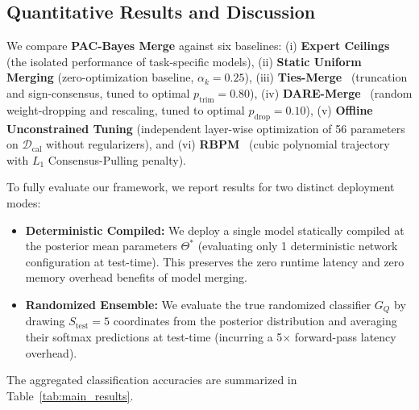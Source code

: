\subsection{Quantitative Results and Discussion}
\label{subsec:quantitative_results}
We compare \textbf{PAC-Bayes Merge} against six baselines: (i) \textbf{Expert Ceilings} (the isolated performance of task-specific models), (ii) \textbf{Static Uniform Merging} (zero-optimization baseline, $\alpha_k = 0.25$), (iii) \textbf{Ties-Merge}~\cite{yadav2023ties} (truncation and sign-consensus, tuned to optimal $p_{\text{trim}}=0.80$), (iv) \textbf{DARE-Merge}~\cite{yu2023dare} (random weight-dropping and rescaling, tuned to optimal $p_{\text{drop}}=0.10$), (v) \textbf{Offline Unconstrained Tuning} (independent layer-wise optimization of 56 parameters on $\mathcal{D}_{\text{cal}}$ without regularizers), and (vi) \textbf{RBPM}~\cite{trial5_submission2} (cubic polynomial trajectory with $L_1$ Consensus-Pulling penalty).

To fully evaluate our framework, we report results for two distinct deployment modes:
\begin{itemize}
    \item \textbf{Deterministic Compiled:} We deploy a single model statically compiled at the posterior mean parameters $\Theta^*$ (evaluating only 1 deterministic network configuration at test-time). This preserves the zero runtime latency and zero memory overhead benefits of model merging.
    \item \textbf{Randomized Ensemble:} We evaluate the true randomized classifier $G_Q$ by drawing $S_{\text{test}} = 5$ coordinates from the posterior distribution and averaging their softmax predictions at test-time (incurring a 5$\times$ forward-pass latency overhead).
\end{itemize}

The aggregated classification accuracies are summarized in Table~\ref{tab:main_results}.

